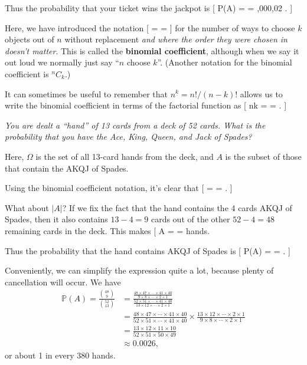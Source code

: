 \documentclass[
  letterpaper,
]{report}
\theoremstyle{definition}
\theoremstyle{definition}
\theoremstyle{remark}
\begin{document}
Thus the probability that your ticket wins the jackpot is {[}
\mathbb P(A) =  = 
\approx {} ,000,02 . {]}

Here, we have introduced the notation {[}  =
 =
 {]} for the number of
ways to choose \(k\) objects out of \(n\) without replacement \emph{and
where the order they were chosen in doesn't matter}. This is called the
\textbf{binomial coefficient}, although when we say it out loud we
normally just say ``\(n\) choose \(k\)''. (Another notation for the
binomial coefficient is \({}^n C_k\).)

It can sometimes be useful to remember that
\({n}^{\underline{k}} = n!/(n-k)!\) allows us to write the binomial
coefficient in terms of the factorial function as {[} \binom nk =
 =  . {]}

\leavevmode{}%
\emph{You are dealt a ``hand'' of 13 cards from a deck of 52 cards. What
is the probability that you have the Ace, King, Queen, and Jack of
Spades?}

Here, \(\Omega\) is the set of all 13-card hands from the deck, and
\(A\) is the subset of those that contain the AKQJ of Spades.

Using the binomial coefficient notation, it's clear that {[}
\textbar{}\Omega\textbar{} =  =
. {]}

What about \(|A|\)? If we fix the fact that the hand contains the 4
cards AKQJ of Spades, then it also contains \(13-4=9\) cards out of the
other \(52-4 = 48\) remaining cards in the deck. This makes {[}
\textbar A\textbar{} =  =
\frac{48\times47\times\cdots\times41\times40}{9\times8\times\cdots\times2\times1}{]}
hands.

Thus the probability that the hand contains AKQJ of Spades is {[}
\mathbb P(A) =  =
 . {]}

Conveniently, we can simplify the expression quite a lot, because plenty
of cancellation will occur. We have \begin{align*}
\mathbb P(A) = \frac{\binom{48}{9}}{\binom{52}{13}}
  &= \frac{\frac{48\times47\times\cdots\times41\times40}{9\times8\times\cdots\times2\times1}}{\frac{52\times51\times\cdots\times41\times40}{13\times12\times\cdots\times2\times1}} \\
  &= \frac{48\times47\times\cdots\times41\times40}{52\times51\times\cdots\times41\times40} \times \frac{13\times12\times\cdots\times2\times1}{9\times8\times\cdots\times2\times1} \\
  &= \frac{13\times12\times11\times10}{52\times51\times50\times49} \\
  &\approx 0.0026 ,
\end{align*} or about 1 in every 380 hands.
\end{document}
